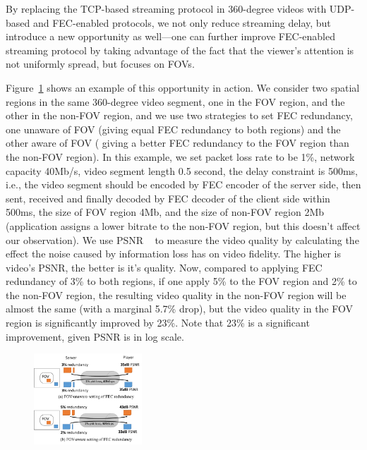 By replacing the TCP-based streaming protocol in 360-degree videos 
with UDP-based and FEC-enabled protocols, we not only reduce 
streaming delay, but 
introduce a new opportunity as well---one can further improve 
FEC-enabled streaming protocol by taking advantage of the 
fact that the viewer's attention is not uniformly spread, 
but focuses on FOVs.

Figure~\ref{fig:example} 
shows an example of this opportunity in action. We
consider two spatial regions in the same 360-degree video segment, 
one in the FOV region, and the other in the non-FOV region, and we use 
two strategies to set FEC redundancy, one unaware of FOV (giving 
equal FEC redundancy to both regions) and the other aware of FOV (\ie 
giving a better FEC redundancy to the FOV region than the non-FOV 
region). In this example, we set packet loss rate to be 1\%,
network capacity 40Mb/s, video segment length 0.5 second, the delay constraint is 500ms, i.e., the video segment should be encoded by FEC encoder of the server side, then sent, received and finally decoded by FEC decoder of the client side within 500ms, the size of FOV region
4Mb, and the size of non-FOV region 2Mb (\eg application assigns 
a lower bitrate to the non-FOV region, but this doesn't affect our 
observation). We use PSNR ~\cite{Viewport-adaptive} to measure the video quality by calculating the effect the noise caused by information loss has on video fidelity. The higher is video's PSNR, the better is it's quality. 
Now, compared to applying FEC redundancy of 3\% to both regions, 
if one apply 5\% to the FOV region and 2\% to the non-FOV region, 
the resulting video quality in the non-FOV region will be almost the 
same (with a marginal 5.7\% drop), but the video quality in the
FOV region is significantly improved by 23\%. 
Note that 23\% is a significant improvement,
given PSNR is in log scale. 


\begin{figure}[t!]
	\centering
	\includegraphics[width=0.36\textwidth]{paper_figs/dante-fec-example.pdf}
	\label{fig:example}
\end{figure}
	
